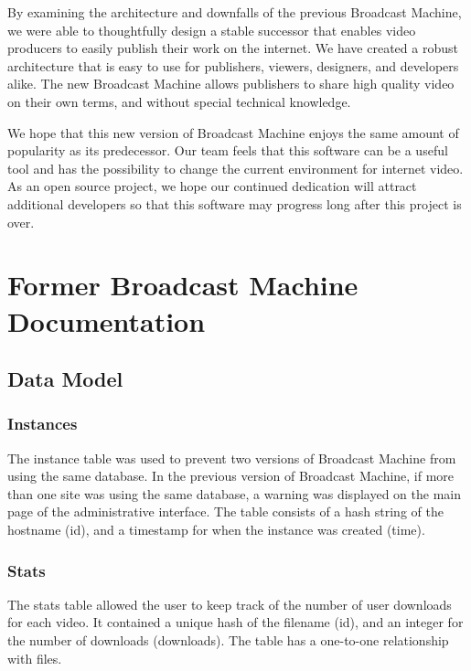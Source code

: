 \documentclass[a4paper,12pt]{report}
\begin{document}
By examining the architecture and downfalls of the previous Broadcast Machine, we were able to thoughtfully design a stable successor that enables video producers to easily publish their work on the internet. We have created a robust architecture that is easy to use for publishers, viewers, designers, and developers alike. The new Broadcast Machine allows publishers to share high quality video on their own terms, and without special technical knowledge.

We hope that this new version of Broadcast Machine enjoys the same amount of popularity as its predecessor.
Our team feels that this software can be a useful tool and has the possibility to change the current environment for internet video.
As an open source project, we hope our continued dedication will attract additional developers so that this software may progress long after this project is over.

\appendix
\chapter{Former Broadcast Machine Documentation}

\section{Data Model}


\subsection{Instances}
The instance table was used to prevent two versions of Broadcast Machine from using the same database. In the previous version of Broadcast Machine, if more than one site was using the same database, a warning was displayed on the main page of the administrative interface. The table consists of a hash string of the hostname (id), and a timestamp for when the instance was created (time). 


\subsection{Stats}
The stats table allowed the user to keep track of the number of user downloads for each video. It contained a unique hash of the filename (id), and an integer for the number of downloads (downloads). The table has a one-to-one relationship with files.
\end{document}
